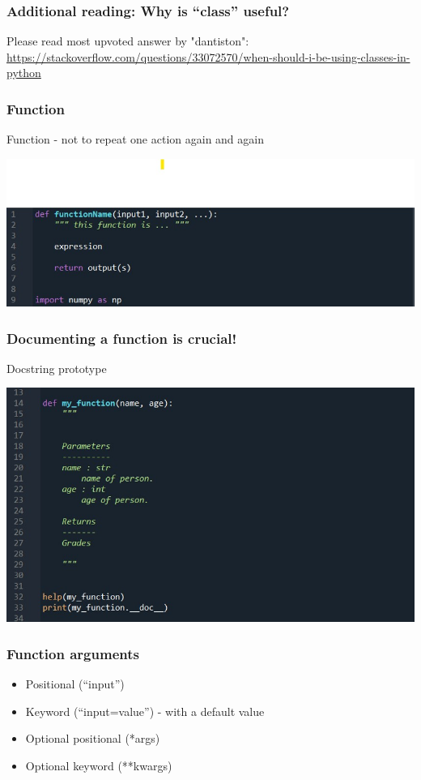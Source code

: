 \documentclass{beamer}
\begin{document}
\begin{frame}
    \frametitle{Additional reading: Why is “class” useful?}
    Please read most upvoted answer by "dantiston":
     \url{https://stackoverflow.com/questions/33072570/when-should-i-be-using-classes-in-python} 
\end{frame}

\begin{frame}
    \frametitle{Function}
    Function - not to repeat one action again and again
        \begin{center}
            \includegraphics[scale=0.5]{figures/function.jpg}
        \end{center}        
    \end{frame}
    
    \begin{frame}
    \frametitle{Documenting a function is crucial!}
    Docstring prototype
            \begin{center}
                \includegraphics[scale=0.5]{figures/documentation.jpg}
            \end{center}
    \end{frame}
    
    \begin{frame}
    \frametitle{Function arguments}
        \begin{itemize}
            \item Positional (“input”) 
            \item Keyword (“input=value”) - with a default value
            \item Optional positional (*args)
            \item Optional keyword (**kwargs)        
        \end{itemize}
    \end{frame}
    
\end{document}
